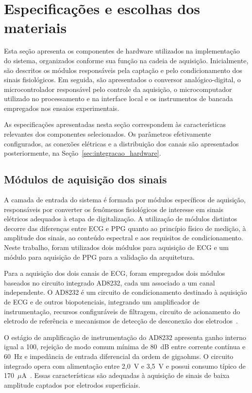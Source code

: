 \documentclass[a4paper,12pt]{fcte}
\begin{document}
\section{Especificações e escolhas dos materiais}
\label{sec:materiais_hardware}

Esta seção apresenta os componentes de hardware utilizados na implementação do sistema, organizados conforme sua função na cadeia de aquisição. Inicialmente, são descritos os módulos responsáveis pela captação e pelo condicionamento dos sinais fisiológicos. Em seguida, são apresentados o conversor analógico-digital, o microcontrolador responsável pelo controle da aquisição, o microcomputador utilizado no processamento e na interface local e os instrumentos de bancada empregados nos ensaios experimentais.

As especificações apresentadas nesta seção correspondem às características relevantes dos componentes selecionados. Os parâmetros efetivamente configurados, as conexões elétricas e a distribuição dos canais são apresentados posteriormente, na Seção~\ref{sec:integracao_hardware}.

\subsection{Módulos de aquisição dos sinais}
\label{subsec:modulos_aquisicao}

A camada de entrada do sistema é formada por módulos específicos de aquisição, responsáveis por converter os fenômenos fisiológicos de interesse em sinais elétricos adequados à etapa de digitalização. A utilização de módulos distintos decorre das diferenças entre ECG e PPG quanto ao princípio físico de medição, à amplitude dos sinais, ao conteúdo espectral e aos requisitos de condicionamento. Neste trabalho, foram utilizados dois módulos para aquisição de ECG e um módulo para aquisição de PPG para a validação da arquitetura.

Para a aquisição dos dois canais de ECG, foram empregados dois módulos baseados no circuito integrado AD8232, cada um associado a um canal independente. O AD8232 é um circuito de condicionamento destinado à aquisição de ECG e de outros biopotenciais, integrando um amplificador de instrumentação, recursos configuráveis de filtragem, circuito de acionamento do eletrodo de referência e mecanismos de detecção de desconexão dos eletrodos~\cite{analogdevices_ad8232}.

O estágio de amplificação de instrumentação do AD8232 apresenta ganho interno igual a 100, rejeição de modo comum mínima de 80~dB entre corrente contínua e 60~Hz e impedância de entrada diferencial da ordem de gigaohms. O circuito integrado opera com alimentação entre 2,0~V e 3,5~V e possui consumo típico de 170~$\mu$A~\cite{analogdevices_ad8232}. Essas características são adequadas à aquisição de sinais de baixa amplitude captados por eletrodos superficiais.
\end{document}
